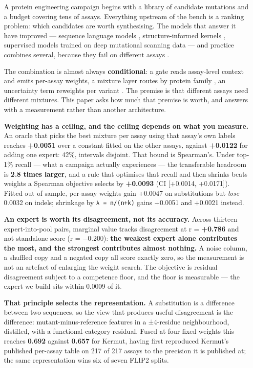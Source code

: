 \documentclass{article}
\begin{document}
A protein engineering campaign begins with a library of candidate mutations and a budget covering tens of
assays. Everything upstream of the bench is a ranking problem: which candidates are worth synthesising. The
models that answer it have improved --- sequence language models \cite{esm2}, structure-informed kernels
\cite{kermut}, supervised models trained on deep mutational scanning data \cite{proteinnpt} --- and practice
combines several, because they fail on different assays \cite{proteingym}.

The combination is almost always \textbf{conditional}: a gate reads assay-level context and emits per-assay
weights, a mixture layer routes by protein family \cite{jacobs1991,shazeer2017}, an uncertainty term
reweights per variant \cite{deepsong}. The premise is that different assays need different mixtures. This
paper asks how much that premise is worth, and answers with a measurement rather than another architecture.

\textbf{Weighting has a ceiling, and the ceiling depends on what you measure.} An oracle that picks the best mixture
per assay using that assay's own labels reaches \textbf{+0.0051} over a constant fitted on the other assays, against
\textbf{+0.0122} for adding one expert: 42\%, intervals disjoint. That bound is Spearman's. Under top-1\% recall --- what
a campaign actually experiences --- the transferable headroom is \textbf{2.8 times larger}, and a rule that optimises
that recall and then shrinks beats weights a Spearman objective selects by \textbf{+0.0093} (CI {[}+0.0014, +0.0171{]}).
Fitted out of sample, per-assay weights gain +0.0047 on substitutions but \emph{lose} 0.0032 on indels; shrinkage by
\texttt{λ\ =\ n/(n+k)} gains +0.0051 and +0.0021 instead.

\textbf{An expert is worth its disagreement, not its accuracy.} Across thirteen expert-into-pool pairs, marginal
value tracks disagreement at r = \textbf{+0.786} and not standalone score (r = −0.200): \textbf{the weakest expert alone contributes the
most, and the strongest contributes almost nothing.} A noise column, a shuffled copy and a negated copy all
score exactly zero, so the measurement is not an artefact of enlarging the weight search. The objective is
residual disagreement subject to a competence floor, and the floor is measurable --- the expert we build sits
within 0.0009 of it.

\textbf{That principle selects the representation.} A substitution is a difference between two sequences, so the view
that produces useful disagreement is the difference: mutant-minus-reference features in a ±4-residue
neighbourhood, distilled, with a functional-category residual. Fused at four fixed weights this reaches \textbf{0.692}
against \textbf{0.657} for Kermut, having first reproduced Kermut's published per-assay table on 217 of 217 assays to the
precision it is published at; the same representation wins six of seven FLIP2 splits.
\end{document}

